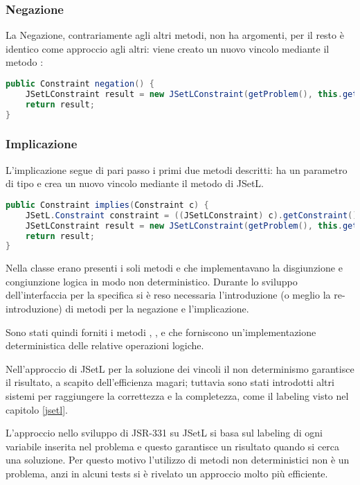 \subsubsection{Negazione}
La Negazione, contrariamente agli altri metodi, non ha argomenti, per il 
resto è identico come approccio agli altri: viene creato un nuovo vincolo
mediante il metodo :
\begin{lstlisting}[language = Java,
                   caption = {\files{negation}.}]
public Constraint negation() {
	JSetLConstraint result = new JSetLConstraint(getProblem(), this.getConstraint().notTest());
	return result;		
}
\end{lstlisting}

\subsubsection{Implicazione}
L'implicazione segue di pari passo i primi due metodi descritti: ha un parametro
di tipo  e crea un nuovo vincolo mediante il metodo
 di JSetL.
\begin{lstlisting}[language = Java,
                   caption = {\files{negation}.}]
public Constraint implies(Constraint c) {	
	JSetL.Constraint constraint = ((JSetLConstraint) c).getConstraint();
	JSetLConstraint result = new JSetLConstraint(getProblem(), this.getConstraint().impliesTest(constraint));
	return result;
}
\end{lstlisting}
\begin{nota}
Nella classe  erano presenti i soli metodi  e
 che implementavano la disgiunzione e congiunzione logica in modo 
non deterministico. Durante lo sviluppo dell'interfaccia per la specifica si
è reso necessaria l'introduzione (o meglio la re-introduzione) di metodi per
la negazione e l'implicazione.

Sono stati quindi forniti i metodi , , e
 che forniscono un'implementazione deterministica delle
relative operazioni logiche.

Nell'approccio di JSetL per la soluzione dei vincoli il non determinismo 
garantisce il risultato, a scapito dell'efficienza magari; tuttavia sono stati 
introdotti altri sistemi per raggiungere la correttezza e la completezza, come 
il labeling visto nel capitolo \ref{jsetl}.

L'approccio nello sviluppo di JSR-331 su JSetL si basa sul labeling di ogni
variabile inserita nel problema e questo garantisce un risultato quando si
cerca una soluzione. Per questo motivo l'utilizzo di metodi non deterministici
non è un problema, anzi in alcuni tests si è rivelato un approccio molto
più efficiente.
\end{nota}

